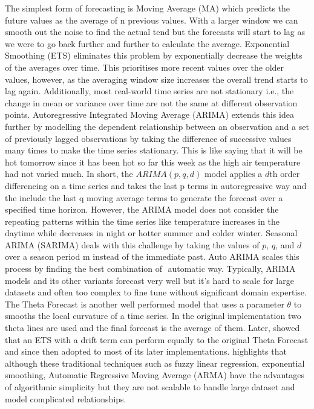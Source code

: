 \documentclass[mstat,12pt]{unswthesis}
\begin{document}
The simplest form of forecasting is Moving Average (MA) which predicts
the future values as the average of n previous values. With a larger
window we can smooth out the noise to find the actual tend but the
forecasts will start to lag as we were to go back further and further to
calculate the average. Exponential Smoothing (ETS) eliminates this
problem by exponentially decrease the weights of the averages over time.
This prioritises more recent values over the older values, however, as
the averaging window size increases the overall trend starts to lag
again. Additionally, most real-world time series are not stationary
i.e., the change in mean or variance over time are not the same at
different observation points. Autoregressive Integrated Moving Average
(ARIMA) \cite{box1970time} extends this idea further by modelling the
dependent relationship between an observation and a set of previously
lagged observations by taking the difference of successive values many
times to make the time series stationary. This is like saying that it
will be hot tomorrow since it has been hot so far this week as the high
air temperature had not varied much. In short, the \(ARIMA(p, q, d)\)
model applies a \(d\)th order differencing on a time series and takes
the last p terms in autoregressive way and the include the last q moving
average terms to generate the forecast over a specified time horizon.
However, the ARIMA model does not consider the repeating patterns within
the time series like temperature increases in the daytime while
decreases in night or hotter summer and colder winter. Seasonal ARIMA
(SARIMA) \cite{box1970time} deals with this challenge by taking the
values of \(p\), \(q\), and \(d\) over a season period m instead of the
immediate past. Auto ARIMA \cite{Hyndman2008} scales this process by
finding the best combination of \(<p, q, d>\) automatic way. Typically,
ARIMA models and its other variants forecast very well but it's hard to
scale for large datasets and often too complex to fine tune without
significant domain expertise. The Theta Forecast
\cite{assimakopoulos2000theta} is another well performed model that uses
a parameter \(\theta\) to smooths the local curvature of a time series.
In the original implementation two theta lines are used and the final
forecast is the average of them. Later, \cite{hyndman2002forecasting}
showed that an ETS with a drift term can perform equally to the original
Theta Forecast and since then adopted to most of its later
implementations. \cite{Wang2021} highlights that although these
traditional techniques such as fuzzy linear regression, exponential
smoothing, Automatic Regressive Moving Average (ARMA) have the
advantages of algorithmic simplicity but they are not scalable to handle
large dataset and model complicated relationships.
\end{document}
